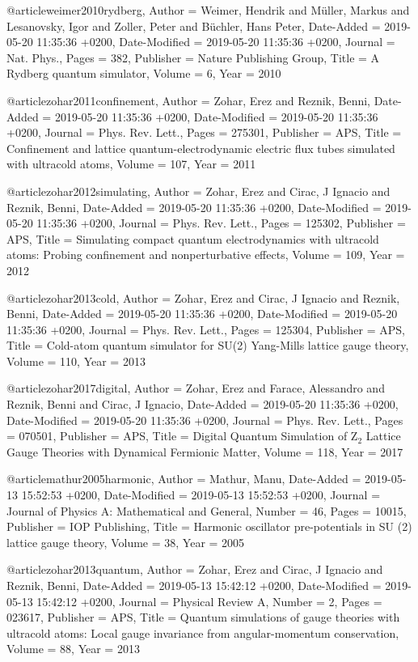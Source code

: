\documentclass[epj,final]{svjour}
\begin{document}
@article{weimer2010rydberg,
	Author = {Weimer, Hendrik and M{\"u}ller, Markus and Lesanovsky, Igor and Zoller, Peter and B{\"u}chler, Hans Peter},
	Date-Added = {2019-05-20 11:35:36 +0200},
	Date-Modified = {2019-05-20 11:35:36 +0200},
	Journal = {Nat. Phys.},
	Pages = {382},
	Publisher = {Nature Publishing Group},
	Title = {A {Rydberg} quantum simulator},
	Volume = {6},
	Year = {2010}}

@article{zohar2011confinement,
	Author = {Zohar, Erez and Reznik, Benni},
	Date-Added = {2019-05-20 11:35:36 +0200},
	Date-Modified = {2019-05-20 11:35:36 +0200},
	Journal = {Phys. Rev. Lett.},
	Pages = {275301},
	Publisher = {APS},
	Title = {Confinement and lattice quantum-electrodynamic electric flux tubes simulated with ultracold atoms},
	Volume = {107},
	Year = {2011}}

@article{zohar2012simulating,
	Author = {Zohar, Erez and Cirac, J Ignacio and Reznik, Benni},
	Date-Added = {2019-05-20 11:35:36 +0200},
	Date-Modified = {2019-05-20 11:35:36 +0200},
	Journal = {Phys. Rev. Lett.},
	Pages = {125302},
	Publisher = {APS},
	Title = {Simulating compact quantum electrodynamics with ultracold atoms: Probing confinement and nonperturbative effects},
	Volume = {109},
	Year = {2012}}

@article{zohar2013cold,
	Author = {Zohar, Erez and Cirac, J Ignacio and Reznik, Benni},
	Date-Added = {2019-05-20 11:35:36 +0200},
	Date-Modified = {2019-05-20 11:35:36 +0200},
	Journal = {Phys. Rev. Lett.},
	Pages = {125304},
	Publisher = {APS},
	Title = {Cold-atom quantum simulator for {SU(2)} {Yang-Mills} lattice gauge theory},
	Volume = {110},
	Year = {2013}}

@article{zohar2017digital,
	Author = {Zohar, Erez and Farace, Alessandro and Reznik, Benni and Cirac, J Ignacio},
	Date-Added = {2019-05-20 11:35:36 +0200},
	Date-Modified = {2019-05-20 11:35:36 +0200},
	Journal = {Phys. Rev. Lett.},
	Pages = {070501},
	Publisher = {APS},
	Title = {Digital Quantum Simulation of {Z}$_2$ Lattice Gauge Theories with Dynamical Fermionic Matter},
	Volume = {118},
	Year = {2017}}

@article{mathur2005harmonic,
	Author = {Mathur, Manu},
	Date-Added = {2019-05-13 15:52:53 +0200},
	Date-Modified = {2019-05-13 15:52:53 +0200},
	Journal = {Journal of Physics A: Mathematical and General},
	Number = {46},
	Pages = {10015},
	Publisher = {IOP Publishing},
	Title = {Harmonic oscillator pre-potentials in SU (2) lattice gauge theory},
	Volume = {38},
	Year = {2005}}

@article{zohar2013quantum,
	Author = {Zohar, Erez and Cirac, J Ignacio and Reznik, Benni},
	Date-Added = {2019-05-13 15:42:12 +0200},
	Date-Modified = {2019-05-13 15:42:12 +0200},
	Journal = {Physical Review A},
	Number = {2},
	Pages = {023617},
	Publisher = {APS},
	Title = {Quantum simulations of gauge theories with ultracold atoms: Local gauge invariance from angular-momentum conservation},
	Volume = {88},
	Year = {2013}}
\end{document}
